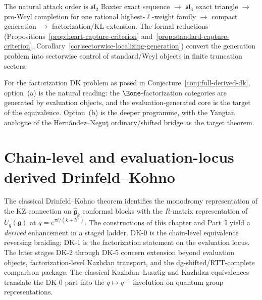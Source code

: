 \begin{remark}
\begin{enumerate}[label=\textup{(\alph*)}]
  The natural attack order is
  $\mathfrak{sl}_2$ Baxter exact sequence
  $\to$ $\mathfrak{sl}_3$ exact triangle
  $\to$ pro-Weyl completion for one rational highest-$\ell$-weight family
  $\to$ compact generation
  $\to$ factorization/KL extension.
  The formal reductions
  \textup{(}Propositions~\textup{\ref{prop:heart-capture-criterion}}
  and~\textup{\ref{prop:standard-capture-criterion}},
  Corollary~\textup{\ref{cor:sectorwise-localizing-generation}}\textup{)}
  convert the generation problem into sectorwise control of
  standard/Weyl objects in finite truncation sectors.
\end{enumerate}
For the factorization DK problem as posed in
Conjecture~\ref{conj:full-derived-dk}, option~(a) is the natural
reading: the $\Eone$-factorization categories are generated by
evaluation objects, and the evaluation-generated core is the
target of the equivalence.
Option~(b) is the deeper programme, with the Yangian analogue
of the Hern\'andez--Negu\c{t} ordinary/shifted bridge
\cite{HerNeg24} as the target theorem.
\end{remark}

\section{Chain-level and evaluation-locus derived Drinfeld--Kohno}
\label{sec:derived-dk}

The classical Drinfeld--Kohno theorem \cite{Kohno87, Drinfeld90}
identifies the monodromy representation of the KZ connection on
$\widehat{\mathfrak{g}}_k$ conformal blocks with the $R$-matrix
representation of $U_q(\mathfrak{g})$ at
$q = e^{\pi i/(k + h^\vee)}$.  The constructions of this chapter
and Part~I yield a \emph{derived} enhancement in a staged ladder.
DK-0 is the chain-level equivalence reversing braiding; DK-1 is the
factorization statement on the evaluation locus.  The later stages
DK-2 through DK-5 concern extension beyond evaluation objects,
factorization-level Kazhdan transport, and the dg-shifted/RTT-complete
comparison package.  The classical Kazhdan--Lusztig and Kazhdan
equivalences translate the DK-0 part into the
$q \mapsto q^{-1}$ involution on quantum group representations.

